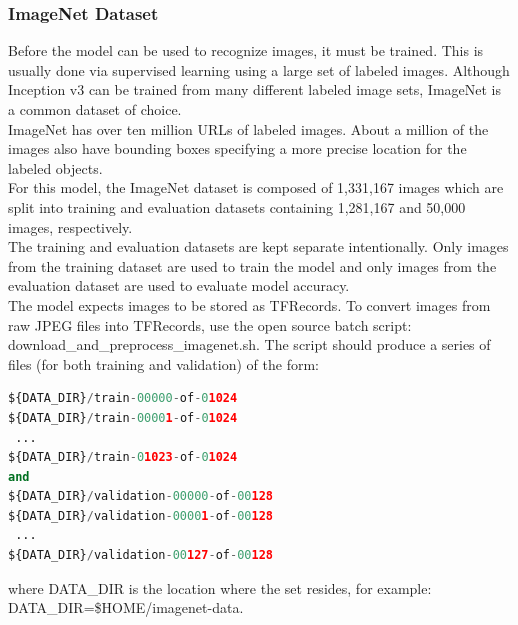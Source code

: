 \documentclass[14pt]{report}
\begin{document}
			\subsubsection{ImageNet Dataset}
			Before the model can be used to recognize images, it must be trained. This is usually done via supervised learning using a large set of labeled images. Although Inception v3 can be trained from many different labeled image sets, ImageNet is a common dataset of choice.\\

			ImageNet has over ten million URLs of labeled images. About a million of the images also have bounding boxes specifying a more precise location for the labeled objects.\\
			
			For this model, the ImageNet dataset is composed of 1,331,167 images which are split into training and evaluation datasets containing 1,281,167 and 50,000 images, respectively.\\
			
			The training and evaluation datasets are kept separate intentionally. Only images from the training dataset are used to train the model and only images from the evaluation dataset are used to evaluate model accuracy.\\
			
			The model expects images to be stored as TFRecords. To convert images from raw JPEG files into TFRecords, use the open source batch script: download\_and\_preprocess\_imagenet.sh. The script should produce a series of files (for both training and validation) of the form:\\
			\begin{lstlisting}[language=Python]
${DATA_DIR}/train-00000-of-01024
${DATA_DIR}/train-00001-of-01024
 ...
${DATA_DIR}/train-01023-of-01024
and
${DATA_DIR}/validation-00000-of-00128
${DATA_DIR}/validation-00001-of-00128
 ...
${DATA_DIR}/validation-00127-of-00128
			\end{lstlisting}
			where DATA\_DIR is the location where the set resides, for example: \\ DATA\_DIR=\$HOME/imagenet-data.
		
\end{document}
